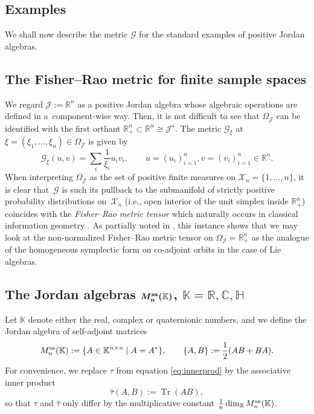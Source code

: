 \documentclass[pdftex]{sigma}
\numberwithin{equation}{section}
\newcommand{\Jcal}{\mathcal{J}}
\newcommand{\R}{{\mathbb R}}
\newcommand{\C}{{\mathbb C}}
\newcommand{\bH}{{\mathbb H}}
\newcommand{\K}{{\mathbb K}}
\newcommand{\Gcal}{\mathcal{G}}
\begin{document}
\subsection{Examples} \label{subsec: examples}

We shall now describe the metric $\Gcal$ for the standard examples of positive Jordan algebras.


\subsection{The Fisher--Rao metric for finite sample spaces}\label{Ex: F-R}

We regard $\Jcal := \R^n $ {as a positive Jordan algebra whose algebraic operations are defined in a~component-wise way.
Then, it is not difficult to see that $\Omega_\Jcal$ can be identified with the first orthant $\R^n_+ \subset \R^{n}\cong \Jcal^\star$.}
The metric $\Gcal_\xi$ at $\xi = (\xi_1, \dots, \xi_n) \in \Omega_\Jcal$ is given by
\[
\Gcal_\xi(u, v) = \sum_i \dfrac1{\xi_i} u_i v_i, \qquad u = (u_i)_{i=1}^n, v = (v_i)_{i=1}^n \in \R^n.
\]
{When interpreting $\Omega_\Jcal$ as the set of positive finite measures on $\mathcal{X}_{n} = \{1, \dots, n\}$, it is clear that~$\Gcal$ {is such its pullback to the submanifold of strictly positive probability distributions on~$\mathcal{X}_{n}$ (i.e., open interior of the unit simplex inside $\R^n_+$) coincides with the {\em Fisher--Rao metric tensor }which naturally occurs in classical information geometry \cite{Amari-1985,A-J-L-S-2017}.}
As partially noted in \cite{C-J-S-2020-02,C-J-S-2020}, this instance shows that we may look at the non-normalized Fisher--Rao metric tensor on $\Omega_\Jcal = \R^n_+$ as the analogue of the homogeneous symplectic form on co-adjoint orbits in the case of Lie algebras.}

\subsection[The Jordan algebras M\_n\^{}\{sa\}(K), K = R, C, bH]{The Jordan algebras $\boldsymbol{ M_n^{\rm sa}(\K)}$, $\boldsymbol{\K = \R, \C, \bH}$}

Let $\K$ denote either the real, complex or quaternionic numbers, and we define the Jordan algebra of self-adjoint matrices
\[
M_n^{\rm sa}(\K) := \{ A \in \K^{n \times n} \mid A = A^\ast\}, \qquad \{A, B\} := \dfrac12 (AB + BA).
\]
For convenience, we replace $\tau$ from equation \eqref{eq:innerprod} by the associative inner product
\[
\hat \tau(A, B) := \operatorname{Tr}(AB),
\]
so that $\tau$ and $\hat \tau$ only differ by the multiplicative constant $\frac 1n \dim_\R M_n^{\rm sa}(\K)$.
\end{document}
